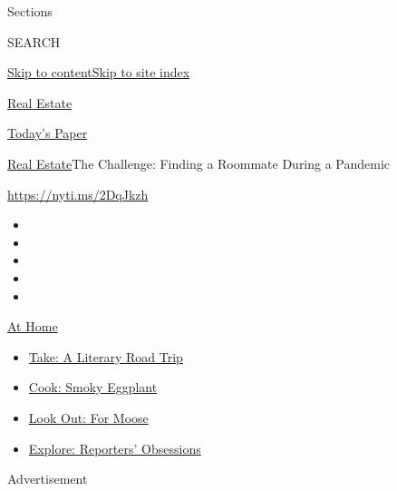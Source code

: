 Sections

SEARCH

\protect\hyperlink{site-content}{Skip to
content}\protect\hyperlink{site-index}{Skip to site index}

\href{https://www.nytimes.com/section/realestate}{Real Estate}

\href{https://myaccount.nytimes.com/auth/login?response_type=cookie\&client_id=vi}{}

\href{https://www.nytimes.com/section/todayspaper}{Today's Paper}

\href{/section/realestate}{Real Estate}\textbar{}The Challenge: Finding
a Roommate During a Pandemic

\url{https://nyti.ms/2DqJkzh}

\begin{itemize}
\item
\item
\item
\item
\item
\end{itemize}

\href{https://www.nytimes.com/spotlight/at-home?action=click\&pgtype=Article\&state=default\&region=TOP_BANNER\&context=at_home_menu}{At
Home}

\begin{itemize}
\tightlist
\item
  \href{https://www.nytimes.com/2020/07/28/books/time-for-a-literary-road-trip.html?action=click\&pgtype=Article\&state=default\&region=TOP_BANNER\&context=at_home_menu}{Take:
  A Literary Road Trip}
\item
  \href{https://www.nytimes.com/2020/07/29/magazine/bored-with-your-home-cooking-some-smoky-eggplant-will-fix-that.html?action=click\&pgtype=Article\&state=default\&region=TOP_BANNER\&context=at_home_menu}{Cook:
  Smoky Eggplant}
\item
  \href{https://www.nytimes.com/2020/07/27/travel/moose-michigan-isle-royale.html?action=click\&pgtype=Article\&state=default\&region=TOP_BANNER\&context=at_home_menu}{Look
  Out: For Moose}
\item
  \href{https://www.nytimes.com/interactive/2020/at-home/even-more-reporters-editors-diaries-lists-recommendations.html?action=click\&pgtype=Article\&state=default\&region=TOP_BANNER\&context=at_home_menu}{Explore:
  Reporters' Obsessions}
\end{itemize}

Advertisement

